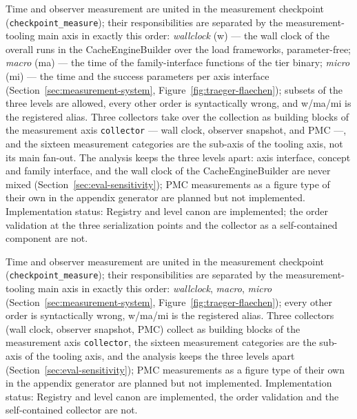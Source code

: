\begin{nurlang}
Time and observer measurement are united in the measurement checkpoint
(\texttt{checkpoint\_measure}); their responsibilities are separated by the measurement-tooling main
axis in exactly this order: \emph{wallclock} (w) --- the wall clock of the overall runs in the
CacheEngineBuilder over the load frameworks, parameter-free; \emph{macro} (ma) --- the time of the
family-interface functions of the tier binary; \emph{micro} (mi) --- the time and the success
parameters per axis interface (Section~\ref{sec:measurement-system},
Figure~\ref{fig:traeger-flaechen}); subsets of the three levels are allowed, every other order is
syntactically wrong, and w/ma/mi is the registered alias. Three collectors take over the collection
as building blocks of the measurement axis \texttt{collector} --- wall clock, observer snapshot, and
PMC ---, and the sixteen measurement categories are the sub-axis of the tooling axis, not its main
fan-out. The analysis keeps the three levels apart: axis interface, concept and family interface, and
the wall clock of the CacheEngineBuilder are never mixed (Section~\ref{sec:eval-sensitivity}); PMC
measurements as a figure type of their own in the appendix generator are planned but not implemented.
Implementation status: Registry and level canon are implemented; the order validation at the three
serialization points and the collector as a self-contained component are not.
\end{nurlang}
\begin{nurkurz}
Time and observer measurement are united in the measurement checkpoint (\texttt{checkpoint\_measure}); their
responsibilities are separated by the measurement-tooling main axis in exactly this order: \emph{wallclock},
\emph{macro}, \emph{micro} (Section~\ref{sec:measurement-system}, Figure~\ref{fig:traeger-flaechen}); every
other order is syntactically wrong, w/ma/mi is the registered alias. Three collectors (wall clock, observer
snapshot, PMC) collect as building blocks of the measurement axis \texttt{collector}, the sixteen
measurement categories are the sub-axis of the tooling axis, and the analysis keeps the three levels apart
(Section~\ref{sec:eval-sensitivity}); PMC measurements as a figure type of their own in the appendix
generator are planned but not implemented. Implementation status: Registry and level canon are implemented,
the order validation and the self-contained collector are not.
\end{nurkurz}

